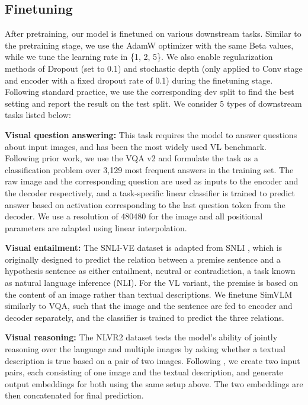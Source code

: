 \documentclass{article} \usepackage{iclr2022_conference,times}
\newcommand{\ours}{SimVLM}
\begin{document}
\subsection{Finetuning}\label{sec:finetuning}

After pretraining, our model is finetuned on various downstream tasks.
Similar to the pretraining stage,
we use the AdamW optimizer with the same Beta values,
while we tune the learning rate in \{1, 2, 5\}.
We also enable regularization methods of Dropout (set to 0.1) and stochastic depth (only applied to Conv stage and encoder with a fixed dropout rate of 0.1) \citep{huang2016deep} during the finetuning stage.
Following standard practice,
we use the corresponding dev split to find the best setting and report the result on the test split.
We consider 5 types of downstream tasks listed below:

\textbf{Visual question answering:}
This task requires the model to answer questions about input images,
and has been the most widely used VL benchmark.
Following prior work, we use the VQA v2 \citep{goyal2017making} and formulate the task as a classification problem over 3,129 most frequent answers in the training set.
The raw image and the corresponding question are used as inputs to the encoder and the decoder respectively, and a task-specific linear classifier is trained to predict answer based on activation corresponding to the last question token from the decoder. We use a resolution of 480480 for the image and all positional parameters are adapted using linear interpolation.

\textbf{Visual entailment:}
The SNLI-VE \citep{xie2019visual} dataset is adapted from SNLI \citep{bowman2015large}, 
which is originally designed to predict the relation between a premise sentence and a hypothesis sentence as either entailment, neutral or contradiction,
a task known as natural language inference (NLI). For the VL variant, the premise is based on the content of an image rather than textual descriptions. We finetune {\ours} similarly to VQA, such that the image and the sentence are fed to encoder and decoder separately, and the classifier is trained to predict the three relations.

\textbf{Visual reasoning:}
The NLVR2 \citep{suhr2018corpus} dataset tests the model's ability of jointly reasoning over the language and multiple images by asking whether a textual description is true based on a pair of two images. Following \cite{Zhang_2021_CVPR},
we create two input pairs, each consisting of one image and the textual description,
and generate output embeddings for both using the same setup above.
The two embeddings are then concatenated for final prediction.
\end{document}

